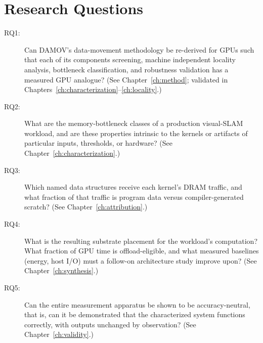 \section{Research Questions}
\begin{description}
\item[RQ1:] Can DAMOV's data-movement methodology be re-derived for GPUs such that each of its components screening, machine independent locality analysis, bottleneck classification, and robustness validation has a measured GPU analogue? (See Chapter~\ref{ch:method}; validated in Chapters~\ref{ch:characterization}--\ref{ch:locality}.)

\item[RQ2:] What are the memory-bottleneck classes of a production visual-SLAM workload, and are these properties intrinsic to the kernels or artifacts of particular inputs, thresholds, or hardware? (See Chapter~\ref{ch:characterization}.)

\item[RQ3:] Which named data structures receive each kernel's DRAM traffic, and what fraction of that traffic is program data versus compiler-generated scratch? (See Chapter~\ref{ch:attribution}.)    

\item[RQ4:] What is the resulting substrate placement for the workload's computation? What fraction of GPU time is offload-eligible, and what measured baselines (energy, host I/O) must a follow-on architecture study improve upon? (See Chapter~\ref{ch:synthesis}.)

\item[RQ5:] Can the entire measurement apparatus be shown to be accuracy-neutral, that is, can it be demonstrated that the characterized system functions correctly, with outputs unchanged by observation? (See Chapter~\ref{ch:validity}.)\end{description}

